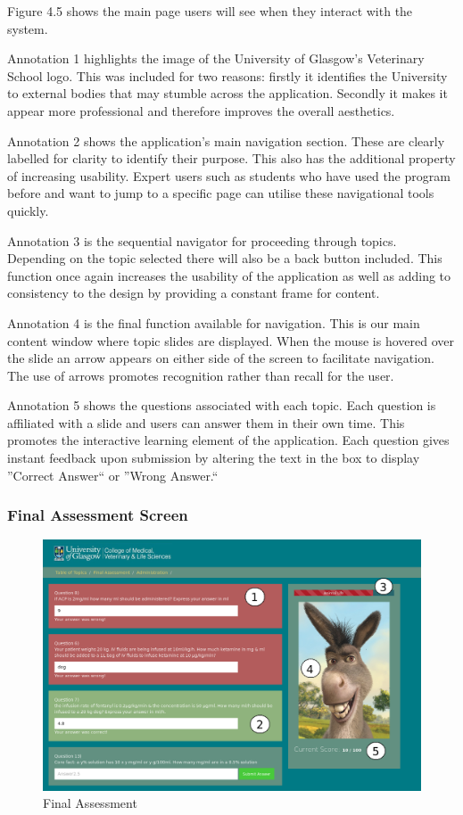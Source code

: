 \documentclass{l3proj}
\begin{document}
Figure 4.5 shows the main page users will see when they interact with the system.

Annotation 1 highlights the image of the University of Glasgow's Veterinary School logo. This was included for two reasons: firstly it identifies the University to external bodies that may stumble across the application. Secondly it makes it appear more professional and therefore improves the overall aesthetics.

Annotation 2 shows the application's main navigation section. These are clearly labelled for clarity to identify their purpose. This also has the additional property of increasing usability. Expert users such as students who have used the program before and want to jump to a specific page can utilise these navigational tools quickly.

Annotation 3 is the sequential navigator for proceeding through topics. Depending on the topic selected there will also be a back button included. This function once again increases the usability of the application as well as adding to consistency to the design by providing a constant frame for content.

Annotation 4 is the final function available for navigation. This is our main content window where topic slides are displayed. When the mouse is hovered over the slide an arrow appears on either side of the screen to facilitate navigation. The use of arrows promotes recognition rather than recall for the user. 

Annotation 5 shows the questions associated with each topic. Each question is affiliated with a slide and users can answer them in their own time. This promotes the interactive learning element of the application. Each question gives instant feedback upon submission by altering the text in the box to display ''Correct Answer`` or ''Wrong Answer.`` 

\subsubsection{Final Assessment Screen}

\begin{figure}[!htb]
\caption{Final Assessment}
\includegraphics[width=\linewidth]{images/annotated_assessment.png}
\end{figure}
\end{document}
